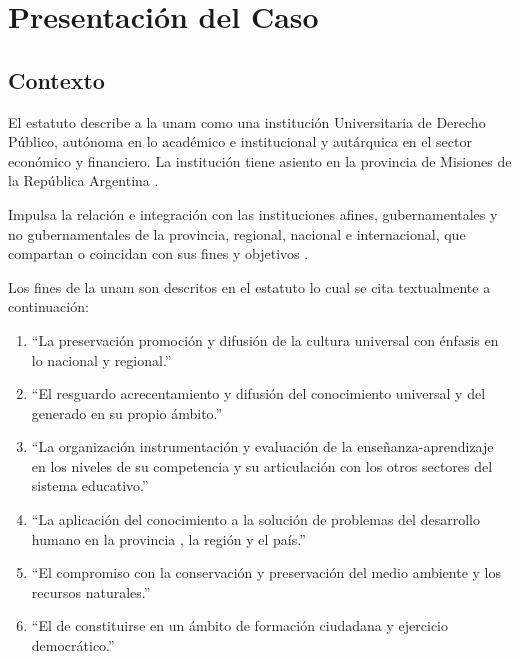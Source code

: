 \chapter{Presentación del Caso} %
\section{Contexto}


El estatuto describe a la \gls{unam} como una institución Universitaria de Derecho Público,
autónoma en lo académico e institucional y
autárquica en el sector económico y financiero. La institución 
tiene asiento en la provincia de Misiones de la República Argentina \cite[]{estatuto}. 

Impulsa la relación e integración con las instituciones afines,
gubernamentales y no gubernamentales de la provincia, regional,
nacional e internacional, que compartan o coincidan con sus fines 
y objetivos \cite[]{estatuto}.

Los fines de la \gls{unam} son descritos en el estatuto lo cual se
cita textualmente a continuación:

\begin{enumerate}
\item “La preservación promoción y difusión de la cultura universal con énfasis en lo nacional y
regional.”
\item “El resguardo acrecentamiento y difusión del conocimiento universal y del generado en su
propio ámbito.”
\item “La organización instrumentación y evaluación de la enseñanza-aprendizaje en los niveles de su
competencia y su articulación con los otros sectores del sistema educativo.”
\item “La aplicación del conocimiento a la solución de problemas del desarrollo humano en la provincia
, la región y el país.”
\item “El compromiso con la conservación y preservación del medio ambiente y los recursos naturales.”
\item “El de constituirse en un ámbito de formación ciudadana y ejercicio democrático.” \cite[]{estatuto}

\end{enumerate}

